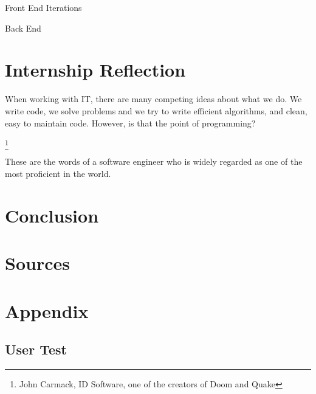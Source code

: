 \documentclass[../main.tex]{subfiles}
\begin{document}
Front End Iterations 

Back End 

\section{Internship Reflection}

When working with IT, there are many competing ideas about what we do. We write
code, we solve problems and we try to write efficient algorithms, and clean, easy to maintain code. However, is that the point of programming? 

\footnote{John Carmack, ID Software, one of the creators of Doom and Quake}

These are the words of a software engineer who is  widely regarded as one of the most proficient in the world.


\section{Conclusion}


\section{Sources}

\section{Appendix}
\label{sec:appendix}

\subsection{User Test}
\label{sec:user_test}
\end{document}
